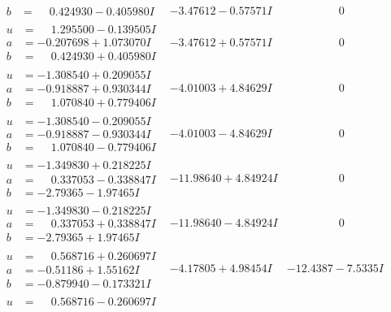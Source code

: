 \documentclass[1p]{elsarticle_modified}
\theoremstyle{definition}
\begin{document}
$$\begin{array}{c|c|c}
\begin{aligned}
b &= \phantom{-}0.424930 - 0.405980 I\end{aligned}
 & -3.47612 - 0.57571 I & \phantom{-0.000000 } 0 \\ \hline\begin{aligned}
u &= \phantom{-}1.295500 - 0.139505 I \\
a &= -0.207698 + 1.073070 I \\
b &= \phantom{-}0.424930 + 0.405980 I\end{aligned}
 & -3.47612 + 0.57571 I & \phantom{-0.000000 } 0 \\ \hline\begin{aligned}
u &= -1.308540 + 0.209055 I \\
a &= -0.918887 + 0.930344 I \\
b &= \phantom{-}1.070840 + 0.779406 I\end{aligned}
 & -4.01003 + 4.84629 I & \phantom{-0.000000 } 0 \\ \hline\begin{aligned}
u &= -1.308540 - 0.209055 I \\
a &= -0.918887 - 0.930344 I \\
b &= \phantom{-}1.070840 - 0.779406 I\end{aligned}
 & -4.01003 - 4.84629 I & \phantom{-0.000000 } 0 \\ \hline\begin{aligned}
u &= -1.349830 + 0.218225 I \\
a &= \phantom{-}0.337053 - 0.338847 I \\
b &= -2.79365 - 1.97465 I\end{aligned}
 & -11.98640 + 4.84924 I & \phantom{-0.000000 } 0 \\ \hline\begin{aligned}
u &= -1.349830 - 0.218225 I \\
a &= \phantom{-}0.337053 + 0.338847 I \\
b &= -2.79365 + 1.97465 I\end{aligned}
 & -11.98640 - 4.84924 I & \phantom{-0.000000 } 0 \\ \hline\begin{aligned}
u &= \phantom{-}0.568716 + 0.260697 I \\
a &= -0.51186 + 1.55162 I \\
b &= -0.879940 - 0.173321 I\end{aligned}
 & -4.17805 + 4.98454 I & -12.4387 - 7.5335 I \\ \hline\begin{aligned}
u &= \phantom{-}0.568716 - 0.260697 I \\

\end{aligned}
\end{array}$$
\end{document}
